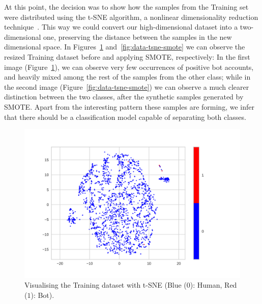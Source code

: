 \documentclass[a4paper, 12pt]{book}
\begin{document}
At this point, the decision was to show how the samples from the Training set were distributed using the t-SNE algorithm, a nonlinear dimensionality reduction technique~\cite{vandermaaten-et-at:t-sne08}. This way we could convert our high-dimensional dataset into a two-dimensional one, preserving the distance between the samples in the new dimensional space. In Figures~\ref{fig:data-tsne} and~\ref{fig:data-tsne-smote} we can observe the resized Training dataset before and applying SMOTE, respectively: In the first image (Figure~\ref{fig:data-tsne}), we can observe very few occurrences of positive bot accounts, and heavily mixed among the rest of the samples from the other class; while in the second image (Figure~\ref{fig:data-tsne-smote}) we can observe a much clearer distinction between the two classes, after the synthetic samples generated by SMOTE. Apart from the interesting pattern these samples are forming, we infer that there should be a classification model capable of separating both classes.

\begin{figure}
 \centering
  \includegraphics[width=15cm, keepaspectratio]{img/data-tsne.png}
  \caption{Visualising the Training dataset with t-SNE (Blue ($0$): Human, Red ($1$): Bot).}
  \label{fig:data-tsne}
\end{figure}
\end{document}
